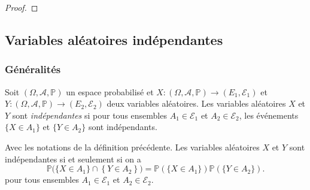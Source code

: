 \begin{proof}
	\pl{\rep{4cm}}

\end{proof}


\subsection{Variables aléatoires indépendantes}

\subsubsection{Généralités}

\begin{definition}
	Soit $(\Omega,\mathcal{A},\mathbb{P})$ un espace probabilisé et  $X:(\Omega,\mathcal{A},\mathbb{P}) \to (E_1, \mathcal{E}_1)$ et  $Y:(\Omega,\mathcal{A},\mathbb{P}) \to (E_2, \mathcal{E}_2)$ deux variables aléatoires.  Les variables aléatoires $X$ et $Y$  sont \emph{indépendantes} si pour tous ensembles $A_1 \in \mathcal E_1$ et $A_2\in \mathcal E_2$, les événements $\{X \in A_1\}$ et $\{ Y \in A_2\} $ sont indépendants.
\end{definition}

\begin{proposition}
	Avec les notations de la définition précédente. %
	Les variables aléatoires $X$ et $Y$ sont indépendantes si et seulement si on a
	$$ \mathbb{P} \Big( \{X \in A_1\} \cap \left\{ Y\in A_2 \right\} \Big) = \mathbb{P} ( \{X \in A_1  \}) \mathbb{P} ( \{Y \in A_2  \}). $$
pour tous ensembles $A_1 \in \mathcal E_1$ et $A_2\in \mathcal E_2$.
\end{proposition}


